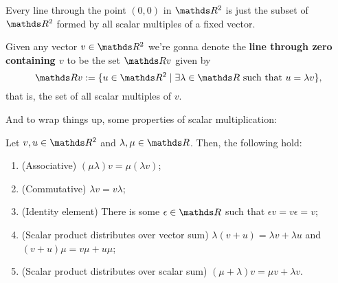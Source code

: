 \begin{cor}
	Every line through the point $(0,0)$ in $\R^2$ is just the subset of $\R^2$ formed by all scalar multiples of a fixed vector.
\end{cor}

\begin{df}
	Given any vector $v\in \R^2$ we're gonna denote the \textbf{line through zero containing $v$} to be the set $\R v$ given by
	\[\R v:=\{u\in \R^2\mid \exists \lambda\in \R\mbox{ such that }u=\lambda v\},\]that is, the set of all scalar multiples of $v$.
\end{df}

And to wrap things up, some properties of scalar multiplication:

\begin{prop}
	Let $v,u\in \R^2$ and $\lambda,\mu\in \R$. Then, the following hold:
	\begin{enumerate}[(1)]
		\item (Associative) $(\mu\lambda)v=\mu(\lambda v)$;
		\item (Commutative) $\lambda v=v\lambda$;
		\item (Identity element) There is some $\epsilon\in \R$ such that $\epsilon v=v\epsilon=v$;
		\item (Scalar product distributes over vector sum) $\lambda(v+u)=\lambda v+\lambda u$ and $(v+u)\mu=v\mu+u\mu$;
		\item (Scalar product distributes over scalar sum) $(\mu+\lambda)v=\mu v+\lambda v$.
	\end{enumerate}
\end{prop}
